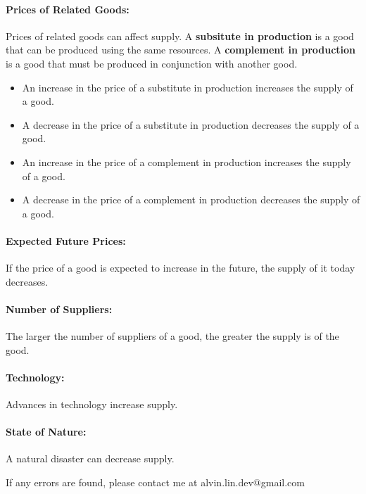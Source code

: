 \documentclass[letterpaper, 12pt]{article}
\begin{document}
\paragraph{Prices of Related Goods:}
Prices of related goods can affect supply. A \textbf{subsitute in production}
is a good that can be produced using the same resources. A \textbf{complement
in production} is a good that must be produced in conjunction with another
good.
\begin{itemize}
  \item An increase in the price of a substitute in production increases the
        supply of a good.
  \item A decrease in the price of a substitute in production decreases the
        supply of a good.
  \item An increase in the price of a complement in production increases the
        supply of a good.
  \item A decrease in the price of a complement in production decreases the
        supply of a good.
\end{itemize}

\paragraph{Expected Future Prices:}
If the price of a good is expected to increase in the future, the supply of it
today decreases.

\paragraph{Number of Suppliers:}
The larger the number of suppliers of a good, the greater the supply is of the
good.

\paragraph{Technology:}
Advances in technology increase supply.

\paragraph{State of Nature:}
A natural disaster can decrease supply.

\begin{center}
  If any errors are found, please contact me at alvin.lin.dev@gmail.com
\end{center}
\end{document}
